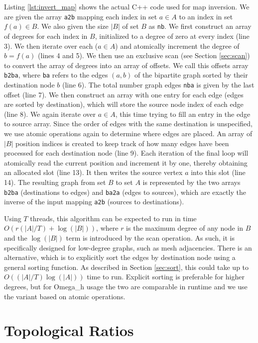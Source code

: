 Listing \ref{lst:invert_map} shows the actual C++ code used for map inversion.
We are given the array \texttt{a2b} mapping each index in set $a\in A$ to an
index in set $f(a)\in B$.
We also given the size $|B|$ of set $B$ as \texttt{nb}.
We first construct an array of degrees for each index in $B$,
initialized to a degree of zero at every index (line 3).
We then iterate over each ($a\in A$) and atomically increment the
degree of $b=f(a)$ (lines 4 and 5).
We then use an exclusive scan (see Section \ref{sec:scan})
to convert the array of degrees into an array of offsets.
We call this offsets array \texttt{b2ba}, where \texttt{ba}
refers to the edges $(a,b)$ of the bipartite graph sorted
by their destination node $b$ (line 6).
The total number graph edges \texttt{nba} is given by the
last offset (line 7).
We then construct an array with one entry for each edge
(edges are sorted by destination), which will store
the source node index of each edge (line 8).
We again iterate over $a\in A$, this time trying to fill
an entry in the edge to source array.
Since the order of edges with the same destination is unspecified,
we use atomic operations again to determine where edges are placed.
An array of $|B|$ position indices is created to keep track of
how many edges have been processed for each destination node (line 9).
Each iteration of the final loop will atomically read the current
position and increment it by one, thereby obtaining an allocated slot
(line 13).
It then writes the source vertex $a$ into this slot (line 14).
The resulting graph from set $B$ to set $A$ is represented by the
two arrays \texttt{b2ba} (destinations to edges) and \texttt{ba2a}
(edges to sources), which are exactly the inverse of the
input mapping \texttt{a2b} (sources to destinations).

Using $T$ threads, this algorithm can be expected to run in time
$O(r(|A|/T)+\log(|B|))$,
where $r$ is the maximum degree of any node in $B$ and the $\log(|B|)$
term is introduced by the scan operation.
As such, it is specifically designed for low-degree graphs,
such as mesh adjacencies.
There is an alternative, which is to explicitly sort the
edges by destination node using a general sorting function.
As described in Section \ref{sec:sort}, this could take up to
$O((|A|/T)\log(|A|))$ time to run.
Explicit sorting is preferable for higher degrees, but for Omega\_h usage
the two are comparable in runtime and we use the variant
based on atomic operations.

\chapter{Topological Ratios}

